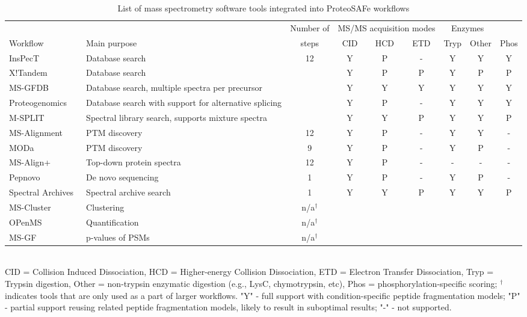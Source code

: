 \documentclass[arial,11pt]{article}
\newcommand{\SF}[1]{\textsf{#1}}
\newcommand{\SYSTEM}[0]{\SF{ProteoSAFe}\xspace}
\begin{document}
\footnotesize
\begin{table}[htb!]
\footnotesize
\begin{tabular}{lp{1.5in}ccccccc}
& & Number of & \multicolumn{3}{c}{MS/MS acquisition modes} & \multicolumn{2}{c}{Enzymes}\\
\cline{4-6}\cline{7-9}
Workflow & Main purpose & steps & CID & HCD & ETD & Tryp & Other & Phos \\
\hline
InsPecT~\cite{Tanner:2005} & Database search & 12 & Y & P & \-- & Y & Y & Y \\
X!Tandem~\cite{Craig:2004} & Database search  &    & Y & P & P   & Y & P & P \\
MS-GFDB~\cite{Kim:2010} & Database search, multiple spectra per precursor
                                                &    & Y & Y & Y   & Y & Y & Y \\
Proteogenomics~\cite{Castellana:2010} & Database search with support for alternative splicing
                                                &    & Y & P & \-- & Y & Y & Y \\
%
M-SPLIT~\cite{Wang:2010} & Spectral library search, supports mixture spectra
                                                &    & Y & Y & P   & Y & Y & P \\
%
MS-Alignment~\cite{Tsur:2005} & PTM discovery  & 12 & Y & P & \-- & Y & Y & \-- \\
MODa~\cite{Na:2010}  & PTM discovery            &  9 & Y & P & \-- & Y & P & \-- \\
%
MS-Align+~\cite{Liu:2010} & Top-down protein spectra
                                                & 12 & Y & P & \-- & \-- & \-- & \-- \\
%
Pepnovo~\cite{Frank:2005} & De novo sequencing & 1& Y & P & \-- & Y & P & \-- \\
Spectral Archives~\cite{Frank:2011} & Spectral archive search
                                                & 1  & Y & Y & P   & Y & Y & P \\
%
MS-Cluster~\cite{Frank:2008} & Clustering & n/a$^\dagger$ & \\
OPenMS~\cite{Reinert:2010} & Quantification & n/a$^\dagger$ & \\
MS-GF~\cite{Kim:2008} & p-values of PSMs & n/a$^\dagger$ & \\
\hline
\end{tabular}
\\
\scriptsize CID = Collision Induced Dissociation, HCD = Higher-energy Collision Dissociation, ETD = Electron Transfer Dissociation, Tryp = Trypsin digestion, Other = non-trypsin enzymatic digestion (e.g., LysC, chymotrypsin, etc), Phos = phosphorylation-specific scoring; $^\dagger$ indicates tools that are only used as a part of larger workflows. "Y" - full support with condition-specific peptide fragmentation models; "P" - partial support reusing related peptide fragmentation models, likely to result in suboptimal results; "\--" - not supported.
\caption{\footnotesize List of mass spectrometry software tools integrated into \SYSTEM workflows} \label{tab:workflows}
\end{table}
\normalsize
\end{document}

